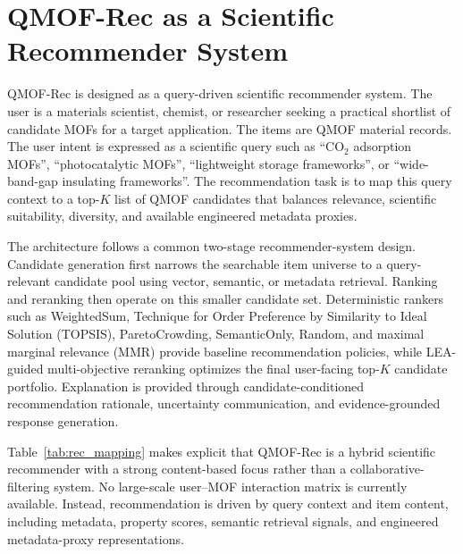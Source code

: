 \documentclass[12pt,a4paper]{article}
\begin{document}
\section{QMOF-Rec as a Scientific Recommender System}
\label{sec:rec}

QMOF-Rec is designed as a query-driven scientific recommender system. The user is a materials scientist, chemist, or researcher seeking a practical shortlist of candidate MOFs for a target application. The items are QMOF material records. The user intent is expressed as a scientific query such as ``CO$_2$ adsorption MOFs'', ``photocatalytic MOFs'', ``lightweight storage frameworks'', or ``wide-band-gap insulating frameworks''. The recommendation task is to map this query context to a top-$K$ list of QMOF candidates that balances relevance, scientific suitability, diversity, and available engineered metadata proxies.

The architecture follows a common two-stage recommender-system design. Candidate generation first narrows the searchable item universe to a query-relevant candidate pool using vector, semantic, or metadata retrieval. Ranking and reranking then operate on this smaller candidate set. Deterministic rankers such as WeightedSum, Technique for Order Preference by Similarity to Ideal Solution (TOPSIS), ParetoCrowding, SemanticOnly, Random, and maximal marginal relevance (MMR) provide baseline recommendation policies, while LEA-guided multi-objective reranking optimizes the final user-facing top-$K$ candidate portfolio. Explanation is provided through candidate-conditioned recommendation rationale, uncertainty communication, and evidence-grounded response generation.

Table~\ref{tab:rec_mapping} makes explicit that QMOF-Rec is a hybrid scientific recommender with a strong content-based focus rather than a collaborative-filtering system. No large-scale user--MOF interaction matrix is currently available. Instead, recommendation is driven by query context and item content, including metadata, property scores, semantic retrieval signals, and engineered metadata-proxy representations.
\end{document}
